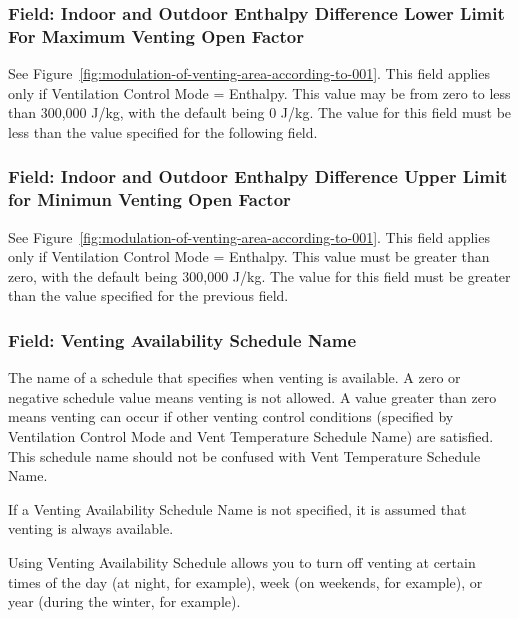 \subsubsection{Field: Indoor and Outdoor Enthalpy Difference Lower Limit For Maximum Venting Open Factor}\label{field-indoor-and-outdoor-enthalpy-difference-lower-limit-for-maximum-venting-open-factor-1}

See Figure~\ref{fig:modulation-of-venting-area-according-to-001}. This field applies only if Ventilation Control Mode = Enthalpy. This value may be from zero to less than 300,000 J/kg, with the default being 0 J/kg. The value for this field must be less than the value specified for the following field.

\subsubsection{Field: Indoor and Outdoor Enthalpy Difference Upper Limit for Minimun Venting Open Factor}\label{field-indoor-and-outdoor-enthalpy-difference-upper-limit-for-minimun-venting-open-factor-1}

See Figure~\ref{fig:modulation-of-venting-area-according-to-001}. This field applies only if Ventilation Control Mode = Enthalpy. This value must be greater than zero, with the default being 300,000 J/kg. The value for this field must be greater than the value specified for the previous field.

\subsubsection{Field: Venting Availability Schedule Name}\label{field-venting-availability-schedule-name-1}

The name of a schedule that specifies when venting is available. A zero or negative schedule value means venting is not allowed. A value greater than zero means venting can occur if other venting control conditions (specified by Ventilation Control Mode and Vent Temperature Schedule Name) are satisfied. This schedule name should not be confused with Vent Temperature Schedule Name.

If a Venting Availability Schedule Name is not specified, it is assumed that venting is always available.

Using Venting Availability Schedule allows you to turn off venting at certain times of the day (at night, for example), week (on weekends, for example), or year (during the winter, for example).

